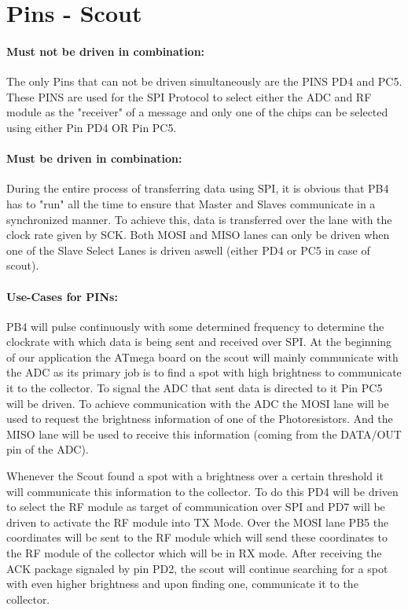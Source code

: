 \documentclass[12pt]{article}
\begin{document}
\lstset{language=C++}

\section*{Pins - Scout}

\paragraph{Must not be driven in combination:}
The only Pins that can not be driven simultaneously are the PINS PD4 and PC5. These PINS are used for the SPI Protocol to select either the ADC and RF module as the "receiver" of a message and only one of the chips can be selected using either Pin PD4 OR Pin PC5.

\paragraph{Must be driven in combination:}
During the entire process of transferring data using SPI, it is obvious that PB4 has to "run" all the time to ensure that Master and Slaves communicate in a  synchronized manner. To achieve this, data is transferred over the lane with the clock rate given by SCK. Both MOSI and MISO lanes can only be driven when one of the Slave Select Lanes is driven aswell (either PD4 or PC5 in case of scout).

\paragraph{Use-Cases for PINs:} PB4 will pulse continuously with some determined frequency to determine the clockrate with which data is being sent and received over SPI. At the beginning of our application the ATmega board on the scout will mainly communicate with the ADC as its primary job is to find a spot with high brightness to communicate it to the collector. To signal the ADC that sent data is directed to it Pin PC5 will be driven. To achieve communication with the ADC the MOSI lane will be used to request the brightness information of one of the Photoresistors. And the MISO lane will be used to receive this information (coming from the DATA/OUT pin of the ADC).

Whenever the Scout found a spot with a brightness over a certain threshold it will communicate this information to the collector. To do this PD4 will be driven to select the RF module as target of communication over SPI and PD7 will be driven to activate the RF module into TX Mode. Over the MOSI lane PB5 the coordinates will be sent to the RF module which will send these coordinates to the RF module of the collector which will be in RX mode. After receiving the ACK package signaled by pin PD2, the scout will continue searching for a spot with even higher brightness and upon finding one, communicate it to the collector.
\end{document}
